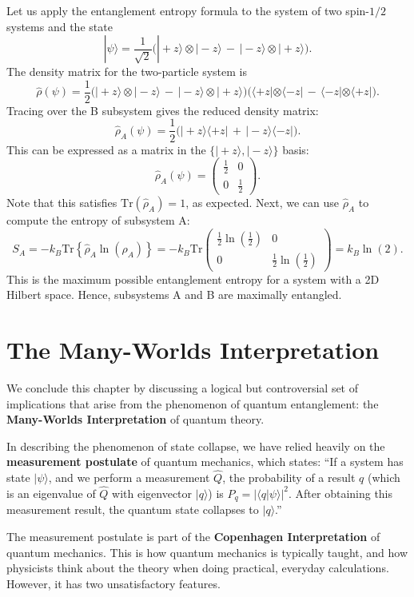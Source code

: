\documentclass[pra,11pt]{revtex4}
\begin{document}
Let us apply the entanglement entropy formula to the system of two
spin-$1/2$ systems and the state
$$|\psi\rangle = \frac{1}{\sqrt{2}} \Big(|\!+\!z\rangle\otimes|\!-\!z\rangle \,-\, |\!-\!z\rangle\otimes|\!+\!z\rangle\Big).$$
The density matrix for the two-particle system is
$$\hat{\rho}(\psi) = \frac{1}{2} \Big(|\!+\!z\rangle\otimes|\!-\!z\rangle \,-\, |\!-\!z\rangle\otimes|\!+\!z\rangle\Big) \Big(\langle+z|\otimes\langle-z| \,-\, \langle-z|\otimes\langle+z|\Big).$$
Tracing over the B subsystem gives the reduced density matrix:
$$\hat{\rho}_A(\psi) = \frac{1}{2} \Big(|\!+\!z\rangle \langle+z| \,+\, |\!-\!z\rangle \langle-z|\Big).$$
This can be expressed as a matrix in the
$\{|\!+z\rangle,|\!-z\rangle\}$ basis:
$$\hat{\rho}_A(\psi) = \begin{pmatrix}\frac{1}{2} & 0 \\ 0 & \frac{1}{2}\end{pmatrix}.$$
Note that this satisfies $\mathrm{Tr}(\hat\rho_A) = 1$, as expected.
Next, we can use $\hat{\rho}_A$ to compute the entropy of subsystem A:
$$S_A = -k_B\mathrm{Tr}\left\{\hat{\rho}_A\ln(\rho_A)\right\} = -k_B\mathrm{Tr}\begin{pmatrix}\frac{1}{2}\ln\left(\frac{1}{2}\right) & 0 \\ 0 & \frac{1}{2}\ln\left(\frac{1}{2}\right)\end{pmatrix} = k_B\ln(2).$$
This is the maximum possible entanglement entropy for a system with a
2D Hilbert space.  Hence, subsystems A and B are maximally entangled.

\section{The Many-Worlds Interpretation}

We conclude this chapter by discussing a logical but controversial set
of implications that arise from the phenomenon of quantum
entanglement: the \textbf{Many-Worlds Interpretation} of quantum
theory.

In describing the phenomenon of state collapse, we have relied heavily
on the \textbf{measurement postulate} of quantum mechanics, which
states: ``If a system has state $|\psi\rangle$, and we perform a
measurement $\hat{Q}$, the probability of a result $q$ (which is an
eigenvalue of $\hat{Q}$ with eigenvector $|q\rangle$) is $P_q =
|\langle q | \psi\rangle|^2$.  After obtaining this measurement
result, the quantum state collapses to $|q\rangle$.''

The measurement postulate is part of the \textbf{Copenhagen
  Interpretation} of quantum mechanics.  This is how quantum mechanics
is typically taught, and how physicists think about the theory when
doing practical, everyday calculations.  However, it has two
unsatisfactory features.
\end{document}
